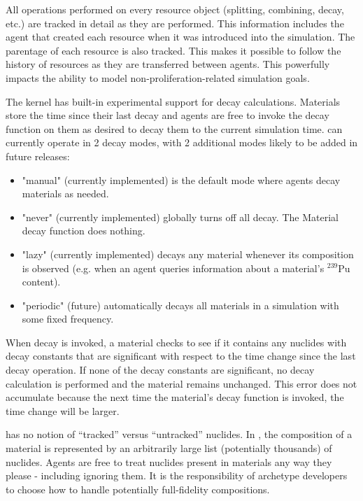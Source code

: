 All operations performed on every resource object (splitting, combining,
decay, etc.) are tracked in detail as they are performed.  This information
includes the agent that created each resource when it was introduced into the
simulation.  The parentage of each resource is also tracked. This makes it
possible to follow the history of resources as they are transferred between
agents.  This powerfully impacts the ability to model
non-proliferation-related simulation goals.

The \Cyclus kernel has built-in experimental support for decay calculations.
Materials store the time since their last decay and agents are free to
invoke the decay function on them as desired to decay them to the current
simulation time. \Cyclus can currently operate in 2 decay modes, with 2 additional
modes likely to be added in future releases:

\begin{itemize}

    \item "manual" (currently implemented) is the default mode
        where agents decay materials as needed.

    \item "never" (currently implemented) globally turns off all decay.
        The Material decay function does nothing.

    \item "lazy" (currently implemented) decays any material whenever its
        composition is observed (e.g. when an agent queries information about
        a material's $^{239}$Pu content).

    \item "periodic" (future) automatically decays all materials in a
        simulation with some fixed frequency.

\end{itemize}


When decay is invoked, a material checks to see if it contains any nuclides with
decay constants that are significant with respect to the time change since the
last decay operation.  If none of the decay constants are significant, no decay
calculation is performed and the material remains unchanged.  This error does
not accumulate because the next time the material's decay function is invoked,
the time change will be larger.

\Cyclus has no notion of ``tracked'' versus ``untracked'' nuclides.  In
\Cyclus, the composition of a material is represented by an arbitrarily large
list (potentially thousands) of nuclides.  Agents are free to treat nuclides
present in materials any way they please - including ignoring them.  It is the
responsibility of archetype developers to choose how to handle potentially
full-fidelity compositions.

